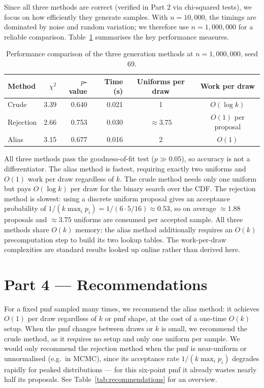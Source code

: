 Since all three methods are correct (verified in Part 2 via chi-squared tests), we focus on how efficiently they generate samples. With $n = 10{,}000$, the timings are dominated by noise and random variation; we therefore use $n = 1{,}000{,}000$ for a reliable comparison. Table~\ref{tab:comparison} summarises the key performance measures.

\begin{table}[h]
\centering
\caption{Performance comparison of the three generation methods at $n = 1{,}000{,}000$, seed 69.}
\label{tab:comparison}
\renewcommand{\arraystretch}{1.2}
\begin{tabular}{lrrrcc}
\toprule
Method    & $\chi^2$ & $p$-value & Time (s) & Uniforms per draw & Work per draw \\
\midrule
Crude     & 3.39     & 0.640     & 0.021    & 1                 & $O(\log k)$ \\
Rejection & 2.66     & 0.753     & 0.030    & $\approx 3.75$    & $O(1)$ per proposal \\
Alias     & 3.15     & 0.677     & 0.016    & 2                 & $O(1)$ \\
\bottomrule
\end{tabular}
\end{table}

All three methods pass the goodness-of-fit test ($p \gg 0.05$), so accuracy is not a differentiator. The alias method is fastest, requiring exactly two uniforms and $O(1)$ work per draw regardless of $k$. The crude method needs only one uniform but pays $O(\log k)$ per draw for the binary search over the CDF. The rejection method is slowest: using a discrete uniform proposal gives an acceptance probability of $1/(k \max_i p_i) = 1/(6 \cdot 5/16) \approx 0.53$, so on average $\approx 1.88$ proposals and $\approx 3.75$ uniforms are consumed per accepted sample. All three methods share $O(k)$ memory; the alias method additionally requires an $O(k)$ precomputation step to build its two lookup tables. The work-per-draw complexities are standard results looked up online rather than derived here.

\section*{Part 4 — Recommendations}

For a fixed pmf sampled many times, we recommend the alias method: it achieves $O(1)$ per draw regardless of $k$ or pmf shape, at the cost of a one-time $O(k)$ setup. When the pmf changes between draws or $k$ is small, we recommend the crude method, as it requires no setup and only one uniform per sample. We would only recommend the rejection method when the pmf is near-uniform or unnormalised (e.g.\ in MCMC), since its acceptance rate $1/(k\max_i p_i)$ degrades rapidly for peaked distributions — for this six-point pmf it already wastes nearly half its proposals. See Table~\ref{tab:recommendations} for an overview.

